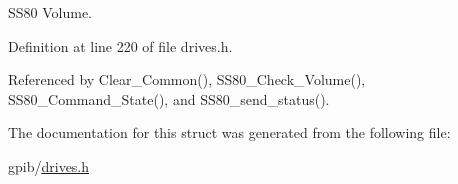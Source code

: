 S\+S80 Volume. 



Definition at line 220 of file drives.\+h.



Referenced by Clear\+\_\+\+Common(), S\+S80\+\_\+\+Check\+\_\+\+Volume(), S\+S80\+\_\+\+Command\+\_\+\+State(), and S\+S80\+\_\+send\+\_\+status().



The documentation for this struct was generated from the following file\+:\begin{DoxyCompactItemize}
\item 
gpib/\hyperlink{drives_8h}{drives.\+h}\end{DoxyCompactItemize}
